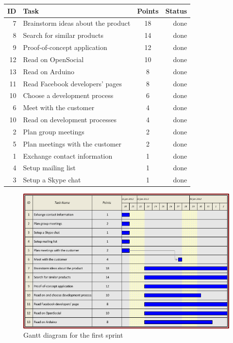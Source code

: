 \begin{table}[ht!]
\begin{tabular}{ | r | l | c | r | }

\hline
\textbf{ID} & \textbf{Task} & \textbf{Points} & \textbf{Status} \\
\hline

 7 & Brainstorm ideas about the product		& 18 & done \\
\hline
 8 & Search for similar products			& 14 & done \\
\hline
 9 & Proof-of-concept application			& 12 & done \\
\hline
12 & Read on OpenSocial						& 10 & done \\
\hline
13 & Read on Arduino						& 8  & done \\
\hline
11 & Read Facebook developers' pages		& 8  & done \\
\hline
10 & Choose a development process			& 6  & done \\
\hline
 6 & Meet with the customer					& 4  & done \\
\hline
10 & Read on development processes			& 4  & done \\
\hline
 2 & Plan group meetings					& 2  & done \\
\hline
 5 & Plan meetings with the customer		& 2  & done \\
\hline
 1 & Exchange contact information			& 1  & done \\
\hline
 4 & Setup mailing list						& 1  & done \\
\hline
 3 & Setup a Skype chat						& 1  & done \\
\hline

\end{tabular}
\end{table}

\newpage

\begin{figure}[h!]
\centering \includegraphics[scale=0.8]{img/sprints-gantt1.png}
\caption{Gantt diagram for the first sprint}
\label{fig:sprints-gantt1}
\end{figure}

